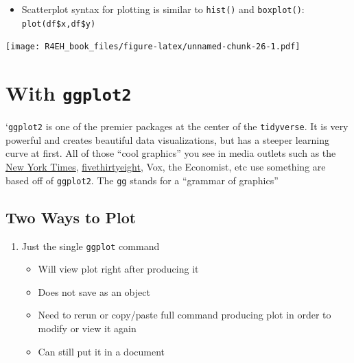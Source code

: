 \documentclass[]{book}
\newenvironment{Shaded}{\begin{snugshade}}{\end{snugshade}}
\newcommand{\KeywordTok}[1]{\textcolor[rgb]{0.13,0.29,0.53}{\textbf{#1}}}
\newcommand{\OperatorTok}[1]{\textcolor[rgb]{0.81,0.36,0.00}{\textbf{#1}}}
\newcommand{\NormalTok}[1]{#1}
\providecommand{\tightlist}{%
  \setlength{\itemsep}{0pt}\setlength{\parskip}{0pt}}
\theoremstyle{definition}
\theoremstyle{definition}
\theoremstyle{definition}
\theoremstyle{remark}
\begin{document}
\begin{itemize}
\tightlist
\item
  Scatterplot syntax for plotting is similar to \texttt{hist()} and
  \texttt{boxplot()}: \texttt{plot(df\$x,df\$y)}
\end{itemize}

\begin{Shaded}
\end{Shaded}

\texttt{[image: R4EH\_book\_files/figure-latex/unnamed-chunk-26-1.pdf]}

\section{\texorpdfstring{With
\texttt{ggplot2}}{With ggplot2}}\label{with-ggplot2}

`\texttt{ggplot2} is one of the premier packages at the center of the
\texttt{tidyverse}. It is very powerful and creates beautiful data
visualizations, but has a steeper learning curve at first. All of those
``cool graphics'' you see in media outlets such as the
\href{https://archive.nytimes.com/www.nytimes.com/interactive/sports/football/2013-fantasy-football-tier-charts-QB.html}{New
York Times},
\href{https://fivethirtyeight.com/features/fastest-airlines-fastest-airports/}{fivethirtyeight},
Vox, the Economist, etc use something are based off of \texttt{ggplot2}.
The \texttt{gg} stands for a ``grammar of graphics''

\subsection{Two Ways to Plot}\label{two-ways-to-plot}

\begin{enumerate}
\def\labelenumi{\arabic{enumi}.}
\tightlist
\item
  Just the single \texttt{ggplot} command

  \begin{itemize}
  \tightlist
  \item
    Will view plot right after producing it
  \item
    Does not save as an object
  \item
    Need to rerun or copy/paste full command producing plot in order to
    modify or view it again
  \item
    Can still put it in a document
  \end{itemize}
\end{enumerate}
\end{document}
